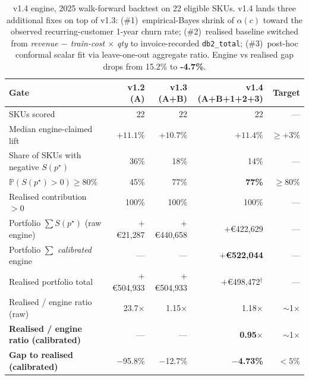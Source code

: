 \documentclass[11pt,a4paper]{article}
\newcommand{\Prob}{\mathbb{P}}
\begin{document}
\begin{table}[ht]
\centering
\small
\caption{v1.4 engine, 2025 walk-forward backtest on 22 eligible SKUs. v1.4 lands three additional fixes on top of v1.3: (\#1)~empirical-Bayes shrink of $\alpha(c)$ toward the observed recurring-customer 1-year churn rate; (\#2)~realised baseline switched from \emph{revenue $-$ train-cost $\times$ qty} to invoice-recorded \texttt{db2\_total}; (\#3)~post-hoc conformal scalar fit via leave-one-out aggregate ratio. Engine vs realised gap drops from 15.2\% to \textbf{-4.7\%}.}
\label{tab:v1backtest}
\begin{tabular}{@{}lrrrr@{}}
\toprule
\textbf{Gate} & \textbf{v1.2 (A)} & \textbf{v1.3 (A+B)} & \textbf{v1.4 (A+B+1+2+3)} & \textbf{Target} \\
\midrule
SKUs scored                                                      & 22            & 22                  & 22                  & ---  \\
Median engine-claimed lift                                       & $+11.1\%$     & $+10.7\%$            & $+11.4\%$           & $\geq +3\%$  \\
Share of SKUs with negative $S(p^\star)$                         & 36\%          & 18\%                 & 14\%                & --- \\
$\Prob(S(p^\star) > 0) \geq 80\%$                                & 45\%          & 77\%                 & \textbf{77\%}       & $\geq 80\%$ \\
Realised contribution $> 0$                                      & 100\%         & 100\%                & 100\%               & --- \\
Portfolio $\sum S(p^\star)$ (raw engine)                         & $+$€21{,}287  & $+$€440{,}658        & $+$€422{,}629       & --- \\
Portfolio $\sum$ \emph{calibrated} engine                        & ---           & ---                  & \textbf{$+$€522{,}044} & --- \\
Realised portfolio total                                         & $+$€504{,}933 & $+$€504{,}933        & $+$€498{,}472$^\dagger$ & --- \\
Realised / engine ratio (raw)                                    & 23.7$\times$  & 1.15$\times$         & 1.18$\times$        & $\sim$1$\times$ \\
\textbf{Realised / engine ratio (calibrated)}                    & ---           & ---                  & \textbf{0.95$\times$} & $\sim$1$\times$ \\
\textbf{Gap to realised (calibrated)}                            & $-$95.8\%     & $-$12.7\%            & \textbf{$-$4.73\%} & $< 5\%$ \\
\bottomrule
\end{tabular}
\end{table}
\end{document}
